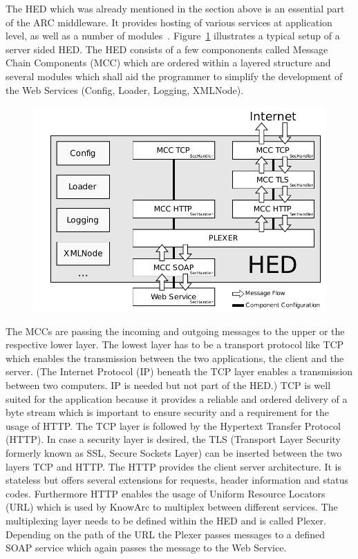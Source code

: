 The HED which was already mentioned in the section above is an essential part of the ARC middleware. It provides hosting of various services at application level, as well as a number of modules~\cite{QIANG_2005}. Figure~\ref{fig:HED_internal} illustrates a typical setup of a server sided HED. The HED consists of a few compononents called Message Chain Components (MCC) which are ordered within a layered structure and several \textcolor{urgent}{modules} which shall aid the programmer to simplify the development of the Web Services (Config, Loader, Logging, XMLNode).
%
\begin{figure}
	\centering
	\includegraphics[width=14cm]{tex_introduction/HED.pdf}
\label{fig:HED_internal}
\end{figure}
The MCCs are passing the incoming and outgoing messages to the upper or the respective lower layer.
The lowest layer has to be a transport protocol like TCP which enables the transmission between the two applications, the client and the server. (The Internet Protocol (IP) beneath the TCP layer enables a transmission between two computers. IP is needed but not part of the HED.) TCP is well suited for the application because it provides a reliable and ordered delivery of a byte stream which is important to ensure security and a requirement for the usage of HTTP.
The TCP layer is followed by the Hypertext Transfer Protocol (HTTP). 
In case a security layer is desired, the TLS (Transport Layer Security formerly known as SSL, Secure Sockets Layer) can be inserted between the two layers TCP and HTTP.
The HTTP provides the client server architecture. It is stateless but offers several extensions for requests, header information and status codes. Furthermore HTTP enables the usage of Uniform Resource Locators (URL) which is used by KnowArc to multiplex between different services. The multiplexing layer needs to be defined within the HED and is called Plexer. Depending on the path of the URL the Plexer passes messages to a defined SOAP service which again passes the message to the Web Service.\\


